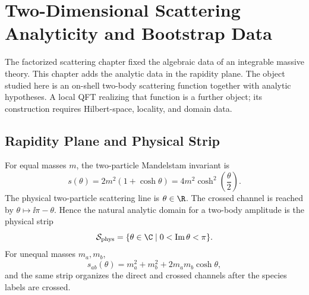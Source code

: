 \chapter{Two-Dimensional Scattering Analyticity and Bootstrap Data}
\label{ch:integrable-scattering-analyticity-bootstrap}

\ConventionsLorentzian

The factorized scattering chapter fixed the algebraic data of an integrable
massive theory.  This chapter adds the analytic data in the rapidity plane.
The object studied here is an on-shell two-body scattering function together
with analytic hypotheses.  A local QFT realizing that function is a further
object; its construction requires Hilbert-space, locality, and domain data.

\section{Rapidity Plane and Physical Strip}

For equal masses \(m\), the two-particle Mandelstam invariant is
\[
  s(\theta)=2m^2(1+\cosh\theta)
  =4m^2\cosh^2\!\left(\frac{\theta}{2}\right).
\]
The physical two-particle scattering line is \(\theta\in\R\).  The crossed
channel is reached by \(\theta\mapsto \ii\pi-\theta\).  Hence the natural
analytic domain for a two-body amplitude is the physical strip
\[
  \mathcal S_{\rm phys}
  =
  \{\theta\in\C\mid 0<\operatorname{Im}\theta<\pi\}.
\]
For unequal masses \(m_a,m_b\),
\[
  s_{ab}(\theta)=m_a^2+m_b^2+2m_am_b\cosh\theta,
\]
and the same strip organizes the direct and crossed channels after the
species labels are crossed.

